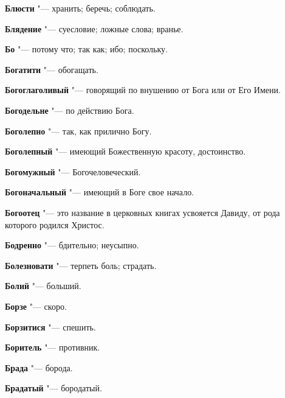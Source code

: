 \begin{mymulticols}{2}
\noindent\textbf{Блюсти} "--- хранить; беречь; соблюдать. 




\noindent\textbf{Блядение} "--- суесловие; ложные слова; вранье. 




\noindent\textbf{Бо} "--- потому что; так как; ибо; поскольку. 




\noindent\textbf{Богатити} "--- обогащать. 




\noindent\textbf{Богоглаголивый} "--- говорящий по внушению от Бога или от Его Имени. 




\noindent\textbf{Богодельне} "--- по действию Бога. 




\noindent\textbf{Боголепно} "--- так, как прилично Богу. 




\noindent\textbf{Боголепный} "--- имеющий Божественную красоту, достоинство. 




\noindent\textbf{Богомужный} "--- Богочеловеческий. 




\noindent\textbf{Богоначальный} "--- имеющий в Боге свое начало. 




\noindent\textbf{Богоотец} "--- это название в церковных книгах усвояется Давиду, от рода которого родился Христос. 




\noindent\textbf{Бодренно} "--- бдительно; неусыпно. 




\noindent\textbf{Болезновати} "--- терпеть боль; страдать. 




\noindent\textbf{Болий} "--- больший. 




\noindent\textbf{Борзе} "--- скоро. 




\noindent\textbf{Борзитися} "--- спешить. 




\noindent\textbf{Боритель} "--- противник. 




\noindent\textbf{Брада} "--- борода. 




\noindent\textbf{Брадатый} "--- бородатый. 





\end{mymulticols}
